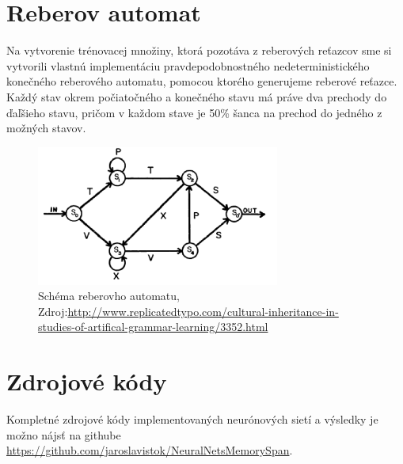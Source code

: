 \section{Reberov automat}
Na vytvorenie trénovacej množiny, ktorá pozotáva z reberových reťazcov sme si vytvorili vlastnú implementáciu pravdepodobnostného nedeterministického
konečného reberového automatu, pomocou ktorého generujeme reberové reťazce.
Každý stav okrem počiatočného a konečného stavu má práve dva prechody do ďaľšieho stavu, 
pričom v každom stave je 50\% šanca na prechod do jedného z možných stavov.
\begin{figure}[H]
    \centering
    \includegraphics[width=8cm]{assets/reber}
    \caption{Schéma reberovho automatu, Zdroj:\url{http://www.replicatedtypo.com/cultural-inheritance-in-studies-of-artifical-grammar-learning/3352.html}}
\end{figure}

\section{Zdrojové kódy}
Kompletné zdrojové kódy implementovaných neurónových sietí a výsledky je možno nájsť na githube \url{https://github.com/jaroslavistok/NeuralNetsMemorySpan}.
